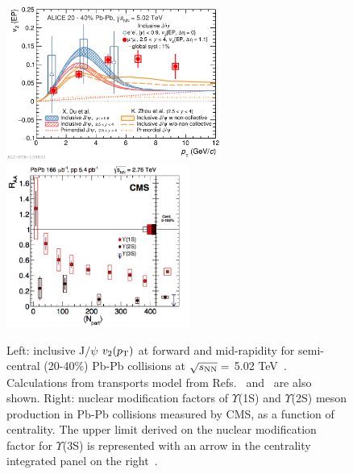 \begin{figure}[!ht]
  \centering
  \includegraphics[width=7cm]{FigCap1/JPsiV2Models.pdf}
  \includegraphics[width=6cm]{FigCap1/RaaUpsilonCMS.png}
  \caption{Left: inclusive J$/\psi$ $v_2(p_{\rm T})$ at forward and mid-rapidity for semi-central (20-40\%) Pb-Pb collisions at $\sqrt{s_{\rm NN}} =$ 5.02 TeV~\cite{Acharya:2017tgv}. Calculations from transports model from Refs.~\cite{Du:2015wha} and~\cite{Zhou:2014kka} are also shown. Right: nuclear modification factors of $\Upsilon$(1S) and $\Upsilon$(2S) meson production in Pb-Pb collisions measured by CMS, as a function of centrality.
The upper limit derived on the nuclear modification factor for $\Upsilon$(3S) is represented with an arrow in the centrality integrated panel on the right~\cite{Khachatryan:2016xxp}. }
  \label{fig:JPsi}
\end{figure}

